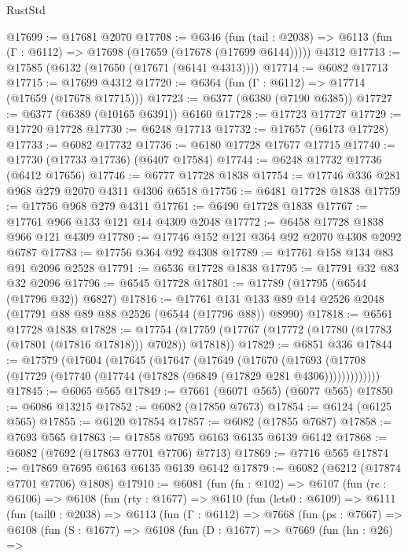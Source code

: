 \begin{lexlean}{RustStd}
\begin{coremodule}
@17699 := @17681 @2070
@17708 := @6346
    (fun (tail : @2038) => @6113 (fun (Γ : @6112) => @17698 (@17659 (@17678 (@17699 @6144)))))
    @4312
@17713 := @17585 (@6132 (@17650 (@17671 (@6141 @4313))))
@17714 := @6082 @17713
@17715 := @17699 @4312
@17720 := @6364 (fun (Γ : @6112) => @17714 (@17659 (@17678 @17715)))
@17723 := @6377 (@6380 (@7190 @6385))
@17727 := @6377 (@6389 (@10165 @6391)) @6160
@17728 := @17723 @17727
@17729 := @17720 @17728
@17730 := @6248 @17713
@17732 := @17657 (@6173 @17728)
@17733 := @6082 @17732
@17736 := @6180 @17728 @17677 @17715
@17740 := @17730 (@17733 @17736) (@6407 @17584)
@17744 := @6248 @17732 @17736 (@6412 @17656)
@17746 := @6777 @17728 @1838
@17754 := @17746 @336 @281 @968 @279 @2070 @4311 @4306 @6518
@17756 := @6481 @17728 @1838
@17759 := @17756 @968 @279 @4311
@17761 := @6490 @17728 @1838
@17767 := @17761 @966 @133 @121 @14 @4309 @2048
@17772 := @6458 @17728 @1838 @966 @121 @4309
@17780 := @17746 @152 @121 @364 @92 @2070 @4308 @2092 @6787
@17783 := @17756 @364 @92 @4308
@17789 := @17761 @158 @134 @83 @91 @2096 @2528
@17791 := @6536 @17728 @1838
@17795 := @17791 @32 @83 @32 @2096
@17796 := @6545 @17728
@17801 := @17789 (@17795 (@6544 (@17796 @32)) @6827)
@17816 := @17761 @131 @133 @89 @14 @2526 @2048 (@17791 @88 @89 @88 @2526 (@6544 (@17796 @88)) @8990)
@17818 := @6561 @17728 @1838
@17828 := @17754 (@17759 (@17767 (@17772 (@17780 (@17783 (@17801 (@17816 @17818))) @7028)) @17818))
@17829 := @6851 @336
@17844 := @17579
    (@17604
      (@17645
        (@17647
          (@17649
            (@17670
              (@17693 (@17708 (@17729 (@17740 (@17744 (@17828 (@6849 (@17829 @281 @4306)))))))))))))
@17845 := @6065 @565
@17849 := @7661 (@6071 @565) (@6077 @565)
@17850 := @6086 @13215
@17852 := @6082 (@17850 @7673)
@17854 := @6124 (@6125 @565)
@17855 := @6120 @17854
@17857 := @6082 (@17855 @7687)
@17858 := @7693 @565
@17863 := @17858 @7695 @6163 @6135 @6139 @6142
@17868 := @6082 (@7692 (@17863 @7701 @7706) @7713)
@17869 := @7716 @565
@17874 := @17869 @7695 @6163 @6135 @6139 @6142
@17879 := @6082 (@6212 (@17874 @7701 @7706) @1808)
@17910 := @6081
    (fun (fn : @102) =>
    @6107
      (fun (rc : @6106) =>
      @6108
        (fun (rty : @1677) =>
        @6110
          (fun (lets0 : @6109) =>
          @6111
            (fun (tail0 : @2038) =>
            @6113
              (fun (Γ : @6112) =>
              @7668
                (fun (ps : @7667) =>
                @6108
                  (fun (S : @1677) =>
                  @6108
                    (fun (D : @1677) =>
                    @7669
                      (fun (hn : @26) =>

\end{coremodule}
\end{lexlean}
